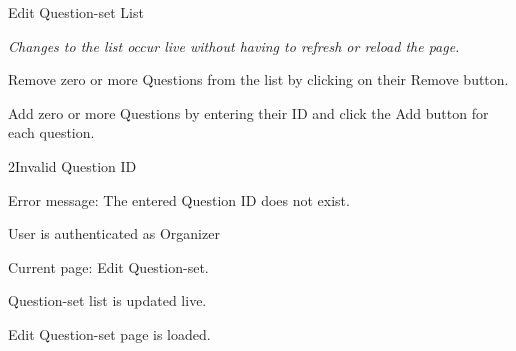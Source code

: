 
\begin{uc}{Edit Question-set List}

	\emph{Changes to the list occur live without having to refresh or reload the page.}
	
	
    \begin{uc-mss}
    \item Remove zero or more Questions from the list by clicking on their Remove button.
	\item Add zero or more Questions by entering their ID and click the Add button for
	each question.
    \end{uc-mss}

    \begin{uc-ext}

        \begin{uc-fail}{2}{Invalid Question ID}
        \item Error message: The entered Question ID does not exist.
        \end{uc-fail}

    \end{uc-ext}

    \begin{uc-pre}
    \item User is authenticated as Organizer
    \item Current page: Edit Question-set.
    \end{uc-pre}

    \begin{uc-post}
    \item Question-set list is updated live.
    \end{uc-post}

    \begin{uc-trig}
        Edit Question-set page is loaded.
    \end{uc-trig}

\end{uc}
